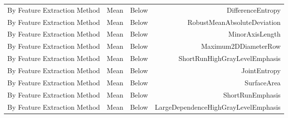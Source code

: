 {\begin{xltabular}{\textwidth}{X l l r}
By Feature Extraction Method & Mean & Below & DifferenceEntropy \\
By Feature Extraction Method & Mean & Below & RobustMeanAbsoluteDeviation \\
By Feature Extraction Method & Mean & Below & MinorAxisLength \\
By Feature Extraction Method & Mean & Below & Maximum2DDiameterRow \\
By Feature Extraction Method & Mean & Below & ShortRunHighGrayLevelEmphasis \\
By Feature Extraction Method & Mean & Below & JointEntropy \\
By Feature Extraction Method & Mean & Below & SurfaceArea \\
By Feature Extraction Method & Mean & Below & ShortRunEmphasis \\
By Feature Extraction Method & Mean & Below & LargeDependenceHighGrayLevelEmphasis \\


\end{xltabular}}
